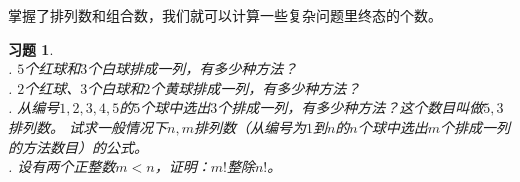 \documentclass[12pt,UTF8]{ctexbook}
\newtheorem{xt}{习题}[section]
\begin{document}
掌握了排列数和组合数，我们就可以计算一些复杂问题里终态的个数。

\begin{xt}
    \mbox{} \\
    . $5$个红球和$3$个白球排成一列，有多少种方法？\\
    . $2$个红球、$3$个白球和$2$个黄球排成一列，有多少种方法？\\
    . 从编号$1,2,3,4,5$的$5$个球中选出$3$个排成一列，有多少种方法？这个数目叫做$5,3$排列数。
    试求一般情况下$n,m$排列数（从编号为$1$到$n$的$n$个球中选出$m$个排成一列的方法数目）的公式。\\
    . 设有两个正整数$m < n$，证明：$m!$整除$n!$。
\end{xt}

\end{document}
